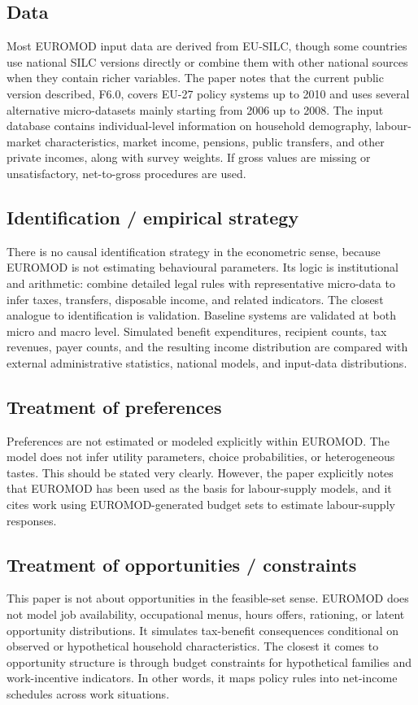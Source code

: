\documentclass[11pt,a4paper]{article}
\begin{document}
\subsection*{Data}
Most EUROMOD input data are derived from EU-SILC, though some countries use national SILC versions directly or combine them with other national sources when they contain richer variables. The paper notes that the current public version described, F6.0, covers EU-27 policy systems up to 2010 and uses several alternative micro-datasets mainly starting from 2006 up to 2008. The input database contains individual-level information on household demography, labour-market characteristics, market income, pensions, public transfers, and other private incomes, along with survey weights. If gross values are missing or unsatisfactory, net-to-gross procedures are used.

\subsection*{Identification / empirical strategy}
There is no causal identification strategy in the econometric sense, because EUROMOD is not estimating behavioural parameters. Its logic is institutional and arithmetic: combine detailed legal rules with representative micro-data to infer taxes, transfers, disposable income, and related indicators. The closest analogue to identification is validation. Baseline systems are validated at both micro and macro level. Simulated benefit expenditures, recipient counts, tax revenues, payer counts, and the resulting income distribution are compared with external administrative statistics, national models, and input-data distributions.

\subsection*{Treatment of preferences}
Preferences are not estimated or modeled explicitly within EUROMOD. The model does not infer utility parameters, choice probabilities, or heterogeneous tastes. This should be stated very clearly. However, the paper explicitly notes that EUROMOD has been used as the basis for labour-supply models, and it cites work using EUROMOD-generated budget sets to estimate labour-supply responses.

\subsection*{Treatment of opportunities / constraints}
This paper is not about opportunities in the feasible-set sense. EUROMOD does not model job availability, occupational menus, hours offers, rationing, or latent opportunity distributions. It simulates tax-benefit consequences conditional on observed or hypothetical household characteristics. The closest it comes to opportunity structure is through budget constraints for hypothetical families and work-incentive indicators. In other words, it maps policy rules into net-income schedules across work situations.
\end{document}
